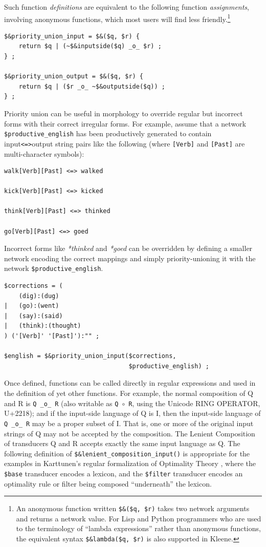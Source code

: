 \documentclass[letterpaper,12pt]{article}
\newcommand{\Kleene}{Kleene\xspace}
\begin{document}
\noindent
Such function \emph{definitions} are equivalent to the following function
\emph{assignments}, involving anonymous functions, which most users will find less
friendly.\footnote{An anonymous function written \verb!$&($q, $r)! takes two network
arguments and returns a network value.  For Lisp and Python programmers who are used to
the terminology of ``lambda expressions'' rather than anonymous functions, 
the equivalent syntax \verb!$&lambda($q, $r)! is also supported in \Kleene{}.}

\begin{Verbatim}[fontsize=\small]
$&priority_union_input = $&($q, $r) {
	return $q | (~$&inputside($q) _o_ $r) ;
} ;

$&priority_union_output = $&($q, $r) {
	return $q | ($r _o_ ~$&outputside($q)) ;
} ;
\end{Verbatim}

Priority union can be useful in morphology to override regular but incorrect
forms with their correct irregular forms.  For example, assume that
a network \verb!$productive_english! has been productively generated to contain
input\verb!<=>!output
string pairs like the following (where \verb![Verb]! and \verb![Past]! are
multi-character symbols):

\begin{Verbatim}[fontsize=\small]
walk[Verb][Past] <=> walked

kick[Verb][Past] <=> kicked

think[Verb][Past] <=> thinked

go[Verb][Past] <=> goed
\end{Verbatim}

\noindent
Incorrect forms like \emph{*thinked} and \emph{*goed} can be overridden by 
defining a
smaller network encoding the correct mappings and simply priority-unioning it with
the network \verb!$productive_english!.

\begin{Verbatim}[fontsize=\small]
$corrections = (
    (dig):(dug)
|   (go):(went)
|   (say):(said)
|   (think):(thought)
) ('[Verb]' '[Past]'):"" ;

$english = $&priority_union_input($corrections, 
                                  $productive_english) ;
\end{Verbatim}


Once defined, functions can be called directly in regular
expressions and used in the definition of yet other functions.  For
example, the normal composition of Q and R 
is \verb!Q _o_ R! (also writable as \verb!Q!~$\circ$~\verb!R!, using the
Unicode RING OPERATOR, U+2218); and if the input-side language of Q is I, then
the input-side language of \verb!Q _o_ R! may be a proper subset of I.
That is, one or more of the original input strings of Q may not be accepted by the 
composition.  The Lenient Composition of transducers Q and R accepts exactly the 
same input language as Q.  The
following definition of \verb!$&lenient_composition_input()! is
appropriate for the examples in Karttunen's regular formalization of Optimality Theory
\cite{karttunen:1998}, where the \verb!$base!
transducer encodes a lexicon, and the \verb!$filter! transducer
encodes an optimality rule or filter being composed
``underneath''
the lexicon.
\end{document}
